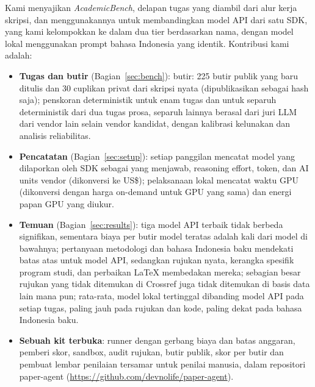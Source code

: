 Kami menyajikan \emph{AcademicBench}, delapan tugas yang diambil dari alur kerja skripsi, dan menggunakannya untuk membandingkan \NApi{} model API dari satu SDK, yang kami kelompokkan ke dalam dua tier berdasarkan nama, dengan \NLocal{} model lokal menggunakan prompt bahasa Indonesia yang identik. Kontribusi kami adalah:
\begin{itemize}
  \item \textbf{Tugas dan butir} (Bagian~\ref{sec:bench}): \NItems{} butir: 225 butir publik yang baru ditulis dan 30 cuplikan privat dari skripsi nyata (dipublikasikan sebagai hash saja); penskoran deterministik untuk enam tugas dan untuk separuh deterministik dari dua tugas prosa, separuh lainnya berasal dari juri LLM dari vendor lain selain vendor kandidat, dengan kalibrasi kelunakan dan analisis reliabilitas.
  \item \textbf{Pencatatan} (Bagian~\ref{sec:setup}): setiap panggilan mencatat model yang dilaporkan oleh SDK sebagai yang menjawab, reasoning effort, token, dan AI units vendor (dikonversi ke US\$); pelaksanaan lokal mencatat waktu GPU (dikonversi dengan harga on-demand untuk GPU yang sama) dan energi papan GPU yang diukur.
  \item \textbf{Temuan} (Bagian~\ref{sec:results}): tiga model API terbaik tidak berbeda signifikan, sementara biaya per butir model teratas adalah \CostRatio{} kali dari model \CheapGap{} di bawahnya; pertanyaan metodologi dan bahasa Indonesia baku mendekati batas atas untuk model API, sedangkan rujukan nyata, kerangka spesifik program studi, dan perbaikan LaTeX membedakan mereka; sebagian besar rujukan yang tidak ditemukan di Crossref juga tidak ditemukan di basis data lain mana pun; rata-rata, model lokal tertinggal dibanding model API pada setiap tugas, paling jauh pada rujukan dan kode, paling dekat pada bahasa Indonesia baku.
  \item \textbf{Sebuah kit terbuka}: runner dengan gerbang biaya dan batas anggaran, pemberi skor, sandbox, audit rujukan, butir publik, skor per butir dan pembuat lembar penilaian tersamar untuk penilai manusia, dalam repositori paper-agent (\url{https://github.com/devnolife/paper-agent}).
\end{itemize}
